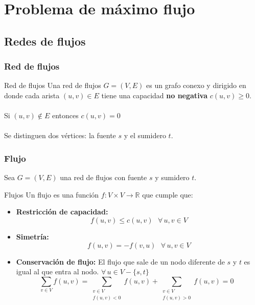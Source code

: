 \documentclass{beamer}
\begin{document}
\section[Problema Max-flow]{Problema de máximo flujo}
	\subsection{Redes de flujos}
	
		\begin{frame}
			\frametitle{Red de flujos}
			\begin{block}{Red de flujos}
				Una red de flujos $G = (V, E)$ es un grafo conexo y dirigido en donde cada arista $(u, v) \in E$ tiene una capacidad \textbf{no negativa} $c(u,v) \geq 0$.\\ \quad \\
				Si $(u, v) \not\in E$ entonces $c(u, v) = 0$ \\ \quad \\
				Se distinguen dos vértices: la fuente $s$ y el sumidero $t$.
			\end{block}
		\end{frame}
	
		\begin{frame}
			\frametitle{Flujo}
			Sea $G = (V, E)$ una red de flujos con fuente $s$ y sumidero $t$.
			\begin{block}{Flujos}
				Un flujo es una función $f:V \times V \rightarrow \mathbb{R}$ que cumple que:
				\begin{itemize}
					\item \textbf{Restricción de capacidad:}
						$$f(u,v) \leq c(u,v) \,\,\,\, \forall\, u,v \in V$$
					\item \textbf{Simetría:} 
						$$f(u,v) = -f(v,u) \,\,\,\, \forall\, u,v \in V$$
					\item \textbf{Conservación de flujo:} El flujo que sale de un nodo diferente de $s$ y $t$ es igual al que entra al nodo. $\forall\, u \in V - \{s, t\}$ 
						$$\displaystyle\sum_{v \in V}{f(u,v)} = \displaystyle\sum_{\substack{v \in V\\f(u,v) < 0}}{f(u,v)} + \displaystyle\sum_{\substack{v \in V\\f(u,v) > 0}}{f(u,v)} = 0 \,\,\,\, $$
				\end{itemize}
			\end{block}
		\end{frame}
	
\end{document}
